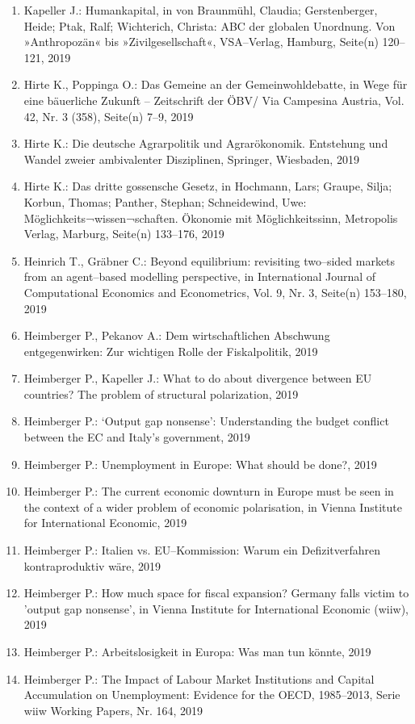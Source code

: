 \begin{enumerate}
	 \item Kapeller J.: Humankapital, in von Braunmühl, Claudia; Gerstenberger, Heide; Ptak, Ralf; Wichterich, Christa: ABC der globalen Unordnung. Von »Anthropozän« bis »Zivilgesellschaft«, VSA--Verlag, Hamburg, Seite(n) 120--121, 2019
	 \item Hirte K., Poppinga O.: Das Gemeine an der Gemeinwohldebatte, in Wege für eine bäuerliche Zukunft – Zeitschrift der ÖBV/ Via Campesina Austria, Vol. 42, Nr. 3 (358), Seite(n) 7--9, 2019
	 \item Hirte K.: Die deutsche Agrarpolitik und Agrarökonomik. Entstehung und Wandel zweier ambivalenter Disziplinen, Springer, Wiesbaden, 2019
	 \item Hirte K.: Das dritte gossensche Gesetz, in Hochmann, Lars; Graupe, Silja; Korbun, Thomas; Panther, Stephan; Schneidewind, Uwe: Möglichkeits¬wissen¬schaften. Ökonomie mit Möglichkeitssinn, Metropolis Verlag, Marburg, Seite(n) 133--176, 2019
	 \item Heinrich T., Gräbner C.: Beyond equilibrium: revisiting two--sided markets from an agent--based modelling perspective, in International Journal of Computational Economics and Econometrics, Vol. 9, Nr. 3, Seite(n) 153--180, 2019
	 \item Heimberger P., Pekanov A.: Dem wirtschaftlichen Abschwung entgegenwirken: Zur wichtigen Rolle der Fiskalpolitik, 2019
	 \item Heimberger P., Kapeller J.: What to do about divergence between EU countries? The problem of structural polarization, 2019
	 \item Heimberger P.: ‘Output gap nonsense': Understanding the budget conflict between the EC and Italy’s government, 2019
	 \item Heimberger P.: Unemployment in Europe: What should be done?, 2019
	 \item Heimberger P.: The current economic downturn in Europe must be seen in the context of a wider problem of economic polarisation, in Vienna Institute for International Economic, 2019
	 \item Heimberger P.: Italien vs. EU--Kommission: Warum ein Defizitverfahren kontraproduktiv wäre, 2019
	 \item Heimberger P.: How much space for fiscal expansion? Germany falls victim to 'output gap nonsense’, in Vienna Institute for International Economic (wiiw), 2019
	 \item Heimberger P.: Arbeitslosigkeit in Europa: Was man tun könnte, 2019
	 \item Heimberger P.: The Impact of Labour Market Institutions and Capital Accumulation on Unemployment: Evidence for the OECD, 1985--2013, Serie wiiw Working Papers, Nr. 164, 2019

\end{enumerate}
